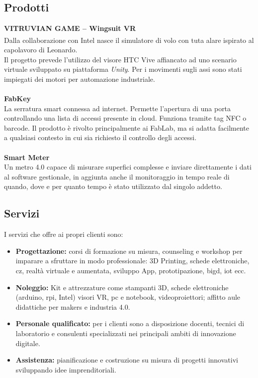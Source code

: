 \subsection{Prodotti}
\textbf{VITRUVIAN GAME – Wingsuit VR}
\\
Dalla collaborazione con Intel\textsuperscript{\textregistered} nasce il simulatore di volo con tuta alare ispirato al capolavoro di Leonardo.\\
Il progetto prevede l'utilizzo del visore HTC Vive affiancato ad uno scenario virtuale sviluppato su piattaforma \textit{Unity}. Per i movimenti sugli assi sono stati impiegati dei motori per automazione industriale.
\\
\\
\textbf{FabKey}
\\
La serratura smart connessa ad internet. Permette l'apertura di una porta controllando una lista di accessi presente in cloud. Funziona tramite tag \gls{NFC} o barcode. Il prodotto è rivolto principalmente ai \gls{FabLab}, ma si adatta facilmente a qualsiasi contesto in cui sia richiesto il controllo degli accessi.
\\
\\
\textbf{Smart Meter}
\\
Un metro 4.0 capace di misurare superfici complesse e inviare direttamente i dati al software gestionale, in aggiunta anche il monitoraggio in tempo reale di quando, dove e per quanto tempo è stato utilizzato dal singolo addetto.


\subsection{Servizi}
I servizi che \lab{} offre ai propri clienti sono:
\begin{itemize}
\item \textbf{Progettazione:} corsi di formazione su misura, \gls{counseling} e \gls{workshop} per imparare a sfruttare in modo professionale: 3D Printing, schede elettroniche, \gls{cz}, realtà virtuale e aumentata, sviluppo App, prototipazione, \gls{bigd}, \gls{iot} ecc.
\item \textbf{Noleggio:} Kit e attrezzature come stampanti 3D, schede elettroniche (\gls{arduino}, \gls{rpi}, Intel) visori VR, pc e notebook, videoproiettori; affitto aule didattiche per \gls{makers} e industria 4.0.
\item \textbf{Personale qualificato:} per i clienti sono a disposizione docenti, tecnici di laboratorio e consulenti specializzati nei principali ambiti di innovazione digitale.
\item \textbf{Assistenza:} pianificazione e costruzione su misura di progetti innovativi sviluppando idee imprenditoriali.
\end{itemize}

